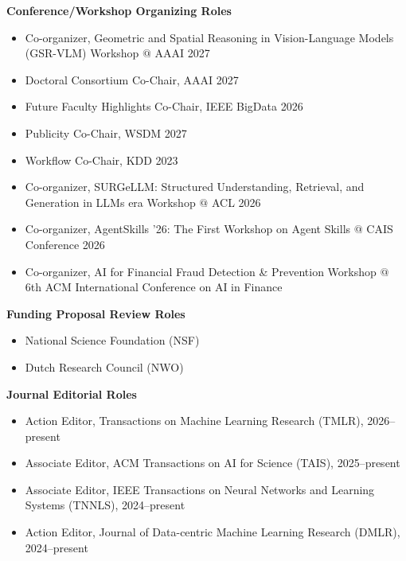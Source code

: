 \documentclass[margin,line,pifont,palatino,courier]{res}
\begin{document}
\begin{resume}
\textbf{Conference/Workshop Organizing Roles}
\begin{itemize}[leftmargin=*]
\setlength\itemsep{-0.1em}
    \item Co-organizer, Geometric and Spatial Reasoning in Vision-Language Models (GSR-VLM) Workshop $@$ AAAI 2027
    \item Doctoral Consortium Co-Chair, AAAI 2027
    \item Future Faculty Highlights Co-Chair, IEEE BigData 2026
    \item Publicity Co-Chair, WSDM 2027
    \item Workflow Co-Chair, KDD 2023
    \item Co-organizer, SURGeLLM: Structured Understanding, Retrieval, and Generation in LLMs era Workshop $@$ ACL 2026
    \item Co-organizer, AgentSkills '26: The First Workshop on Agent Skills $@$ CAIS Conference 2026
    \item Co-organizer, AI for Financial Fraud Detection \& Prevention Workshop $@$ 6th ACM International Conference on AI in Finance

\end{itemize}

\textbf{Funding Proposal Review Roles}
\begin{itemize}[leftmargin=*]
\setlength\itemsep{-0.1em}
    \item National Science Foundation (NSF)
    \item Dutch Research Council (NWO) 
\end{itemize}

\textbf{Journal Editorial Roles}
\begin{itemize}[leftmargin=*]
\setlength\itemsep{-0.1em}
    \item Action Editor, Transactions on Machine Learning Research (TMLR), 2026--present
    \item Associate Editor, ACM Transactions on AI for Science (TAIS), 2025--present
    \item Associate Editor, IEEE Transactions on Neural Networks and Learning Systems (TNNLS), 2024--present
    \item Action Editor, Journal of Data-centric Machine Learning Research (DMLR), 2024--present
\end{itemize}


\end{resume}
\end{document}
